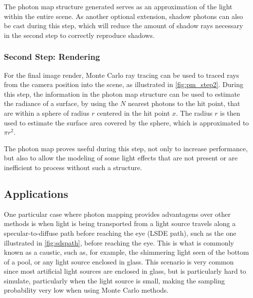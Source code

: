 \documentclass[main.tex]{subfiles}
\begin{document}
The photon map structure generated serves as an approximation of the light within the entire scene. As another optional extension, shadow photons can also be cast during this step, which will reduce the amount of shadow rays necessary in the second step to correctly reproduce shadows.


\subsubsection{Second Step: Rendering}

For the final image render, Monte Carlo ray tracing \cite{jensen2003monte} can be used to traced rays from the camera position into the scene, as illustrated in \cref{fig:pm_step2}. During this step, the information in the photon map structure can be used to estimate the radiance of a surface, by using the $N$ nearest photons to the hit point, that are within a sphere of radius $r$ centered in the hit point $x$. The radius $r$ is then used to estimate the surface area covered by the sphere, which is approximated to $\pi r^{2}$.

The photon map proves useful during this step, not only to increase performance, but also to allow the modeling of some light effects that are not present or are inefficient to process without such a structure.



\subsection{Applications}

One particular case where photon mapping provides advantagens over other methods is when light is being transported from a light source travels along a specular-to-diffuse path before reaching the eye (LSDE path), such as the one illustrated in \cref{fig:sdspath}, before reaching the eye. This is what is commonly known as a caustic, such as, for example, the shimmering light seen of the bottom of a pool, or any light source enclosed in glass. This scenario is very common since most artificial light sources are enclosed in glass, but is particularly hard to simulate, particularly when the light source is small, making the sampling probability very low when using Monte Carlo methods.
\end{document}
